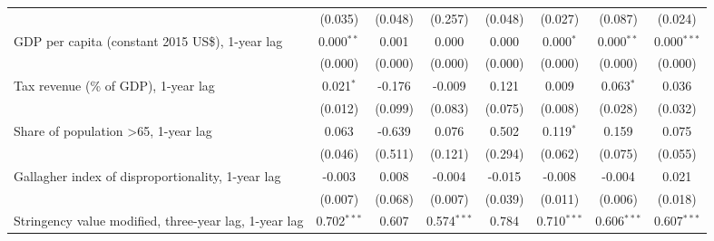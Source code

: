 \begin{table}[htbp]
\begin{tabular}{lccccccc}
                                                                                                 & (0.035)        & (0.048)                   & (0.257)        & (0.048)          & (0.027)         & (0.087)         & (0.024)\\   
      GDP per capita (constant 2015 US\$), 1-year lag                                            & 0.000$^{**}$   & 0.001                     & 0.000          & 0.000            & 0.000$^{*}$     & 0.000$^{**}$    & 0.000$^{***}$\\   
                                                                                                 & (0.000)        & (0.000)                   & (0.000)        & (0.000)          & (0.000)         & (0.000)         & (0.000)\\   
      Tax revenue (\% of GDP), 1-year lag                                                        & 0.021$^{*}$    & -0.176                    & -0.009         & 0.121            & 0.009           & 0.063$^{*}$     & 0.036\\   
                                                                                                 & (0.012)        & (0.099)                   & (0.083)        & (0.075)          & (0.008)         & (0.028)         & (0.032)\\   
      Share of population >65, 1-year lag                                                        & 0.063          & -0.639                    & 0.076          & 0.502            & 0.119$^{*}$     & 0.159           & 0.075\\   
                                                                                                 & (0.046)        & (0.511)                   & (0.121)        & (0.294)          & (0.062)         & (0.075)         & (0.055)\\   
      Gallagher index of disproportionality, 1-year lag                                          & -0.003         & 0.008                     & -0.004         & -0.015           & -0.008          & -0.004          & 0.021\\   
                                                                                                 & (0.007)        & (0.068)                   & (0.007)        & (0.039)          & (0.011)         & (0.006)         & (0.018)\\   
      Stringency value modified, three-year lag, 1-year lag                                      & 0.702$^{***}$  & 0.607                     & 0.574$^{***}$  & 0.784            & 0.710$^{***}$   & 0.606$^{***}$   & 0.607$^{***}$\\   

\end{tabular}
\end{table}
